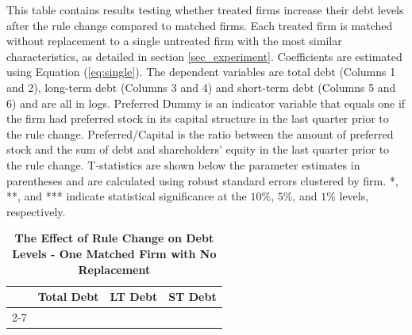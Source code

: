 \documentclass[a4paper, 12pt]{article}
\begin{document}
\begin{table}[htbp]
\caption{\textbf{The Effect of Rule Change on Debt Levels - One Matched Firm with No Replacement}} \label{table_debt_alt}
\begin{singlespace}
\begin{small}

\noindent This table contains results testing whether treated firms increase their debt levels after the rule change compared to matched firms. Each treated firm is matched without replacement to a single untreated firm with the most similar characteristics, as detailed in section \ref{sec_experiment}. Coefficients are estimated using Equation (\ref{eq:single}). The dependent variables are total debt (Columns 1 and 2), long-term debt (Columns 3 and 4) and short-term debt (Columns 5 and 6) and are all in logs. Preferred Dummy is an indicator variable that equals one if the firm had preferred stock in its capital structure in the last quarter prior to the rule change. Preferred/Capital is the ratio between the amount of preferred stock and the sum of debt and shareholders' equity in the last quarter prior to the rule change. T-statistics are shown below the parameter estimates in parentheses and are calculated using robust standard errors clustered by firm. *, **, and *** indicate statistical significance at the $10\%$, $5\%$, and $1\%$ levels, respectively.

\end{small}
\end{singlespace}
\vspace{3mm}
\small
  \centering
    \begin{tabular}{lcccccc}
    \toprule
    \textbf{} &
      \multicolumn{2}{c}{\textbf{Total Debt}} &  \multicolumn{2}{c}{\textbf{LT Debt}} &
      \multicolumn{2}{c}{\textbf{ST Debt}}
      \\
      \cline{2-7}



    \bottomrule
    \end{tabular}
\end{table}
\clearpage
\end{document}
